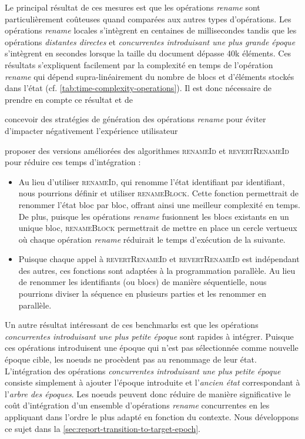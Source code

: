 \documentclass[12pt]{thesul}
\begin{document}
Le principal résultat de ces mesures est que les opérations \emph{rename} sont particulièrement coûteuses quand comparées aux autres types d'opérations.
Les opérations \emph{rename} locales s'intègrent en centaines de millisecondes tandis que les opérations \emph{distantes directes} et \emph{concurrentes introduisant une plus grande époque} s'intègrent en secondes lorsque la taille du document dépasse 40k éléments.
Ces résultats s'expliquent facilement par la complexité en temps de l'opération \emph{rename} qui dépend supra-linéairement du nombre de blocs et d'éléments stockés dans l'état (cf. \autoref{tab:time-complexity-operations}).
Il est donc nécessaire de prendre en compte ce résultat et de
\begin{enumerate*}[label=(\roman*)]
  \item concevoir des stratégies de génération des opérations \emph{rename} pour éviter d'impacter négativement l'expérience utilisateur
  \item proposer des versions améliorées des algorithmes \textsc{renameId} et \textsc{revertRenameId} pour réduire ces temps d'intégration :
\end{enumerate*}

\begin{itemize}
  \item Au lieu d'utiliser \textsc{renameId}, qui renomme l'état identifiant par identifiant, nous pourrions définir et utiliser \textsc{renameBlock}.
    Cette fonction permettrait de renommer l'état bloc par bloc, offrant ainsi une meilleur complexité en temps.
    De plus, puisque les opérations \emph{rename} fusionnent les blocs existants en un unique bloc, \textsc{renameBlock} permettrait de mettre en place un cercle vertueux où chaque opération \emph{rename} réduirait le temps d'exécution de la suivante.
  \item Puisque chaque appel à \textsc{revertRenameId} et \textsc{revertRenameId} est indépendant des autres, ces fonctions sont adaptées à la programmation parallèle.
    Au lieu de renommer les identifiants (ou blocs) de manière séquentielle, nous pourrions diviser la séquence en plusieurs parties et les renommer en parallèle.
\end{itemize}

Un autre résultat intéressant de ces benchmarks est que les opérations \emph{concurrentes introduisant une plus petite époque} sont rapides à intégrer.
Puisque ces opérations introduisent une époque qui n'est pas sélectionnée comme nouvelle époque cible, les noeuds ne procèdent pas au renommage de leur état.
L'intégration des opérations \emph{concurrentes introduisant une plus petite époque} consiste simplement à ajouter l'époque introduite et l'\emph{ancien état} correspondant à l'\emph{arbre des époques}.
Les noeuds peuvent donc réduire de manière significative le coût d'intégration d'un ensemble d'opérations \emph{rename} concurrentes en les appliquant dans l'ordre le plus adapté en fonction du contexte.
Nous développons ce sujet dans la \autoref{sec:report-transition-to-target-epoch}.
\end{document}
